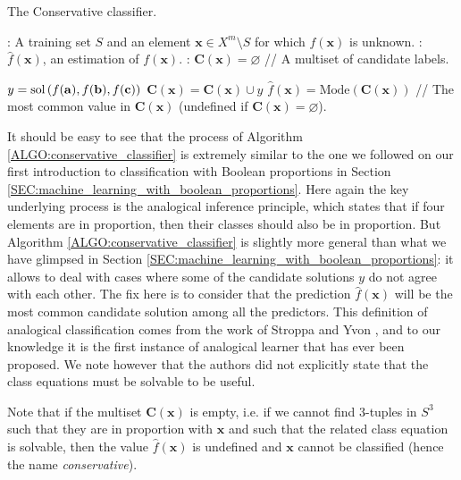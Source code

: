\begin{algorithm}[!ht]
\caption{The Conservative classifier.}
\label{ALGO:conservative_classifier}
  \begin{algorithmic}
    : A training set $S$ and an element $\mathbf{x} \in X^m
    \setminus S$ for which $f(\mathbf{x})$ is unknown.
    : $\hat{f}(\mathbf{x})$, an estimation of
    $f(\mathbf{x})$.
    : $\mathbf{C}(\mathbf{x}) = \varnothing$ \quad \quad // A multiset of candidate
    labels.

    \STATE $y = \text{sol}\left(f(\mathbf{a}), f(\mathbf{b}), f(\mathbf{c})\right)$
    \STATE $ \mathbf{C}(\mathbf{x}) = \mathbf{C}(\mathbf{x}) \cup y$
    \ENDIF
	  \ENDFOR
    \STATE $\hat{f}(\mathbf{x}) = \text{Mode} (\mathbf{C}(\mathbf{x}))$ // The most common value in
    $\mathbf{C}(\mathbf{x})$ (undefined if $\mathbf{C}(\mathbf{x}) = \varnothing$).
  \end{algorithmic}
\end{algorithm}

It should be easy to see that the process of Algorithm
\ref{ALGO:conservative_classifier} is extremely similar to the one we followed
on our first introduction to classification with Boolean proportions in
Section \ref{SEC:machine_learning_with_boolean_proportions}. Here again the key
underlying process is the analogical inference principle, which states that if
four elements are in proportion, then their classes should also be in
proportion. But Algorithm \ref{ALGO:conservative_classifier} is slightly more
general than what we have glimpsed in Section
\ref{SEC:machine_learning_with_boolean_proportions}: it allows to deal with
cases where some of the candidate solutions $y$ do not agree with each other.
The fix here is to consider that the prediction $\hat{f}(\mathbf{x})$ will be
the most common candidate solution among all the predictors. This definition of
analogical classification comes from the work of Stroppa and Yvon
\cite{StrYvoCNLL05, StrYvoREPORT05}, and to our knowledge it is the first
instance of analogical learner that has ever been proposed. We note however
that the authors did not explicitly state that the class equations must be
solvable to be useful.

Note that if the multiset $\mathbf{C}(\mathbf{x})$ is empty, i.e. if we cannot find
$3$-tuples in $S^3$ such that they are in proportion with $\mathbf{x}$ and such
that the related class equation is solvable, then the value
$\hat{f}(\mathbf{x})$  is undefined and $\mathbf{x}$ cannot be classified
(hence the name \textit{conservative}).

